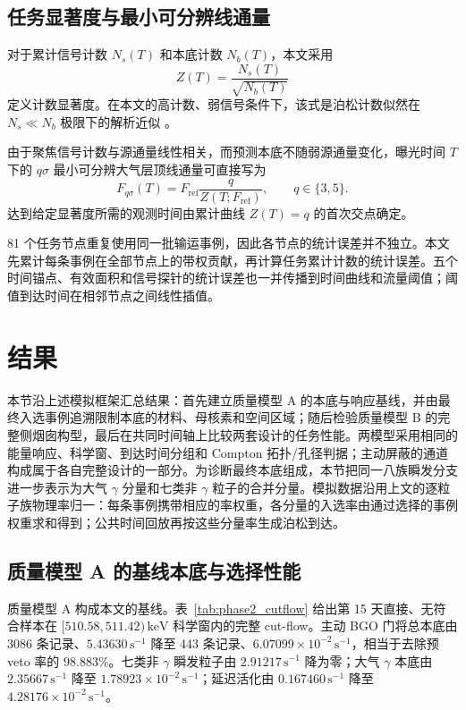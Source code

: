 \documentclass[11pt]{article}
\newcommand{\revblue}[1]{\textcolor{revisionblue}{#1}}
\newcommand{\keV}{\,\mathrm{keV}}
\newcommand{\cps}{\,\mathrm{s^{-1}}}
\newcommand{\fref}{F_{\mathrm{ref}}}
\begin{document}
\subsection{任务显著度与最小可分辨线通量}
\label{sec:mission_sensitivity_zh}

对于累计信号计数 $N_s(T)$ 和本底计数 $N_b(T)$，本文采用
\begin{equation}
 Z(T)=\frac{N_s(T)}{\sqrt{N_b(T)}}
 \label{eq:mission_significance_zh}
\end{equation}
定义计数显著度。在本文的高计数、弱信号条件下，该式是泊松计数似然在 $N_s\ll N_b$ 极限下的解析近似 \cite{Cowan2011}。

由于聚焦信号计数与源通量线性相关，而预测本底不随弱源通量变化，曝光时间 $T$ 下的 $q\sigma$ 最小可分辨大气层顶线通量可直接写为
\begin{equation}
 F_{q\sigma}(T)=\fref\frac{q}{Z(T;\fref)},
 \qquad q\in\{3,5\}.
 \label{eq:minimum_flux_zh}
\end{equation}
达到给定显著度所需的观测时间由累计曲线 $Z(T)=q$ 的首次交点确定。

81 个任务节点重复使用同一批输运事例，因此各节点的统计误差并不独立。本文先累计每条事例在全部节点上的带权贡献，再计算任务累计计数的统计误差。五个时间锚点、有效面积和信号探针的统计误差也一并传播到时间曲线和流量阈值；阈值到达时间在相邻节点之间线性插值。


\section{结果}
\label{sec:results}

本节沿上述模拟框架汇总结果：首先建立质量模型 A 的本底与响应基线，并由最终入选事例追溯限制本底的材料、母核素和空间区域；随后检验质量模型 B 的完整侧烟囱构型，最后在共同时间轴上比较两套设计的任务性能。两模型采用相同的能量响应、科学窗、到达时间分组和 Compton 拓扑/孔径判据；主动屏蔽的通道构成属于各自完整设计的一部分。\revblue{为诊断最终本底组成，本节把同一八族瞬发分支进一步表示为大气 $\gamma$ 分量和七类非 $\gamma$ 粒子的合并分量。模拟数据沿用上文的逐粒子族物理率归一：每条事例携带相应的率权重，各分量的入选率由通过选择的事例权重求和得到；公共时间回放再按这些分量率生成泊松到达。}

\subsection{质量模型 A 的基线本底与选择性能}
\label{subsec:model_a_baseline_zh}
\label{subsec:reference_background_results_zh}

质量模型 A 构成本文的基线。表~\ref{tab:phase2_cutflow} 给出第 15 天直接、无符合样本在 $[510.58,511.42)\keV$ 科学窗内的完整 cut-flow。主动 BGO 门将总本底由 3086 条记录、$5.43630\cps$ 降至 443 条记录、$6.07099\times10^{-2}\cps$，相当于去除预 veto 率的 $98.883\%$。\revblue{七类非 $\gamma$ 瞬发粒子}由 $2.91217\cps$ 降为零；\revblue{大气 $\gamma$ 本底}由 $2.35667\cps$ 降至 $1.78923\times10^{-2}\cps$；延迟活化由 $0.167460\cps$ 降至 $4.28176\times10^{-2}\cps$。
\end{document}
